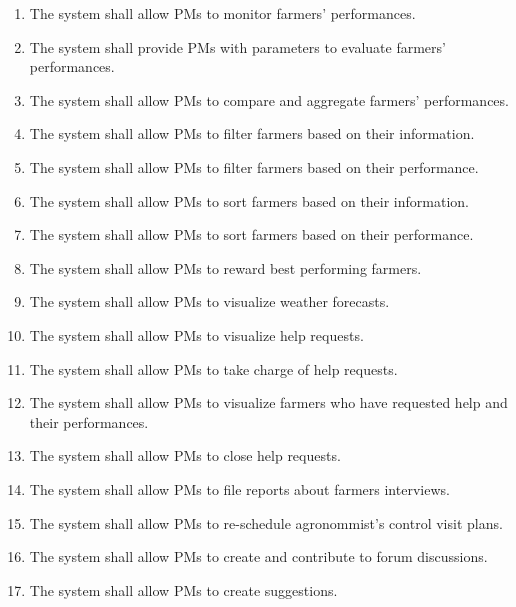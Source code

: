\documentclass[10pt]{article}
\begin{document}
\begin{enumerate}[label=\textbf{R\arabic*}]
    \item \label{req:pmMonitor} The system shall allow PMs to monitor farmers' performances.    
    \item \label{req:pmParameters} The system shall provide PMs with parameters to evaluate farmers' performances.   
    \item \label{req:pmGrades} The system shall allow PMs to compare and aggregate farmers' performances.    
    \item \label{req:pmFilter1} The system shall allow PMs to filter farmers based on their information.    
    \item \label{req:pmFilter2} The system shall allow PMs to filter farmers based on their performance.    
    \item \label{req:pmSort1} The system shall allow PMs to sort farmers based on their information.    
    \item \label{req:pmSort2} The system shall allow PMs to sort farmers based on their performance.     
    \item \label{req:pmRewards} The system shall allow PMs to reward best performing farmers.    
    \item \label{req:pmWeather} The system shall allow PMs to visualize weather forecasts.    
    \item \label{req:pmHelp1} The system shall allow PMs to visualize help requests.
    \item \label{req:pmHelp2} The system shall allow PMs to take charge of help requests.
    \item \label{req:pmHelp3} The system shall allow PMs to visualize farmers who have requested help and their performances.
    \item \label{req:pmHelp4} The system shall allow PMs to close help requests.
    \item \label{req:pmInterview} The system shall allow PMs to file reports about farmers interviews.    
    \item \label{req:pmVisits} The system shall allow PMs to re-schedule agronommist's control visit plans.    
    \item \label{req:pmForum} The system shall allow PMs to create and contribute to forum discussions.    
    \item \label{req:pmSuggestions} The system shall allow PMs to create suggestions.
\end{enumerate}
\end{document}
